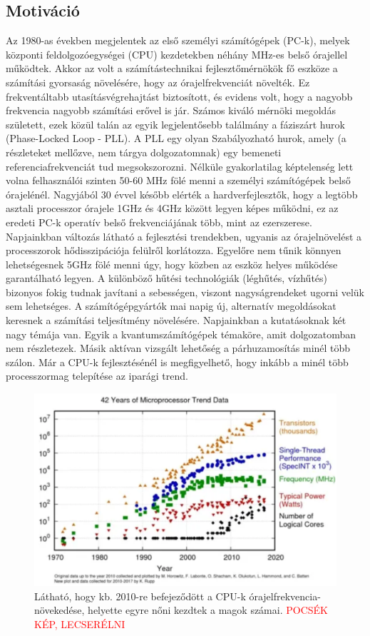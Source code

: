 \subsection{Motiváció}
Az 1980-as években megjelentek az első személyi számítógépek (PC-k), melyek központi feldolgozóegységei (CPU) kezdetekben néhány MHz-es belső órajellel működtek. Akkor az volt a számítástechnikai fejlesztőmérnökök fő eszköze a számítási gyorsaság növelésére, hogy az órajelfrekvenciát növelték. Ez frekventáltabb utasításvégrehajtást biztosított, és evidens volt, hogy a nagyobb frekvencia nagyobb számítási erővel is jár. Számos kiváló mérnöki megoldás született, ezek közül talán az egyik legjelentősebb találmány a fáziszárt hurok (Phase-Locked Loop - PLL). A PLL egy olyan Szabályozható hurok, amely (a részleteket mellőzve, nem tárgya dolgozatomnak) egy bemeneti referenciafrekvenciát tud megsokszorozni. Nélküle gyakorlatilag képtelenség lett volna felhasználói szinten 50-60 MHz fölé menni a személyi számítógépek belső órajelénél. Nagyjából 30 évvel később elérték a hardverfejlesztők, hogy a legtöbb asztali processzor órajele 1GHz és 4GHz között legyen képes működni, ez az eredeti PC-k operatív belső frekvenciájának több, mint az ezerszerese. Napjainkban változás látható a fejlesztési trendekben, ugyanis az órajelnövelést a processzorok hődisszipációja felülről korlátozza. Egyelőre nem tűnik könnyen lehetségesnek 5GHz fölé menni úgy, hogy közben az eszköz helyes működése garantálható legyen. A különböző hűtési technológiák (léghűtés, vízhűtés) bizonyos fokig tudnak javítani a sebességen, viszont nagyságrendeket ugorni velük sem lehetséges. 
A számítógépgyártók mai napig új, alternatív megoldásokat keresnek a számítási teljesítmény növelésére. Napjainkban a kutatásoknak két nagy témája van. Egyik a kvantumszámítógépek témaköre, amit dolgozatomban nem részletezek. Másik aktívan vizsgált lehetőség a párhuzamosítás minél több szálon. Már a CPU-k fejlesztésénél is megfigyelhető, hogy inkább a minél több processzormag telepítése az iparági trend.

\begin{figure}[ht!]
	\centering
	\includegraphics[width=150mm, keepaspectratio]{figures/CPU-cores-trend.png}
	\caption{Látható, hogy kb. 2010-re befejeződött a CPU-k órajelfrekvencia-növekedése, helyette egyre nőni kezdtek a magok számai. \cite{CPUcores} \textcolor{red}{POCSÉK KÉP, LECSERÉLNI} }
\end{figure}

